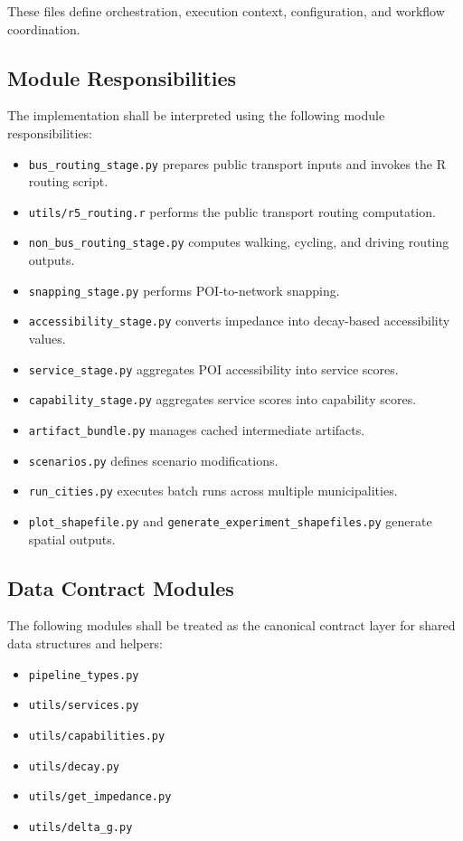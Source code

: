 \documentclass[11pt]{article}
\begin{document}
These files define orchestration, execution context, configuration, and workflow coordination.

\subsection*{Module Responsibilities}

The implementation shall be interpreted using the following module responsibilities:

\begin{itemize}
  \item \texttt{bus\_routing\_stage.py} prepares public transport inputs and invokes the R routing script.
  \item \texttt{utils/r5\_routing.r} performs the public transport routing computation.
  \item \texttt{non\_bus\_routing\_stage.py} computes walking, cycling, and driving routing outputs.
  \item \texttt{snapping\_stage.py} performs POI-to-network snapping.
  \item \texttt{accessibility\_stage.py} converts impedance into decay-based accessibility values.
  \item \texttt{service\_stage.py} aggregates POI accessibility into service scores.
  \item \texttt{capability\_stage.py} aggregates service scores into capability scores.
  \item \texttt{artifact\_bundle.py} manages cached intermediate artifacts.
  \item \texttt{scenarios.py} defines scenario modifications.
  \item \texttt{run\_cities.py} executes batch runs across multiple municipalities.
  \item \texttt{plot\_shapefile.py} and \texttt{generate\_experiment\_shapefiles.py} generate spatial outputs.
\end{itemize}

\subsection*{Data Contract Modules}

The following modules shall be treated as the canonical contract layer for shared data structures and helpers:

\begin{itemize}
  \item \texttt{pipeline\_types.py}
  \item \texttt{utils/services.py}
  \item \texttt{utils/capabilities.py}
  \item \texttt{utils/decay.py}
  \item \texttt{utils/get\_impedance.py}
  \item \texttt{utils/delta\_g.py}
\end{itemize}
\end{document}
